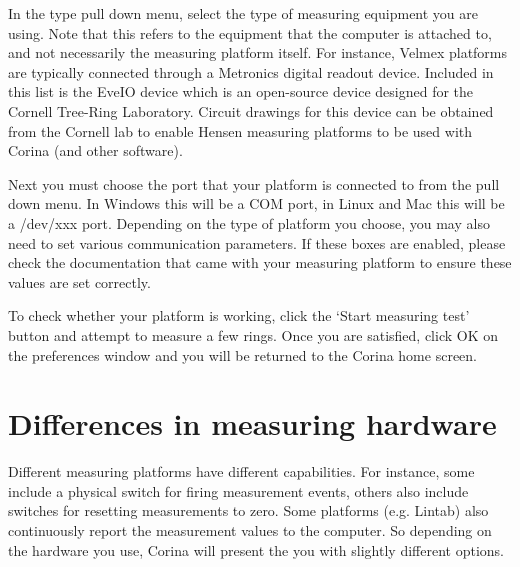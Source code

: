 In the type pull down menu, select the type of measuring equipment you are using. Note that this refers to the equipment that the computer is attached to, and not necessarily the measuring platform itself. For instance, Velmex platforms are typically connected through a Metronics digital readout device. Included in this list is the EveIO device which is an open-source device designed for the Cornell Tree-Ring Laboratory. Circuit drawings for this device can be obtained from the Cornell lab to enable Hensen measuring platforms to be used with Corina (and other software).


Next you must choose the port that your platform is connected to from the pull down menu. In Windows this will be a COM port, in Linux and Mac this will be a /dev/xxx port.  Depending on the type of platform you choose, you may also need to set various communication parameters.  If these boxes are enabled, please check the documentation that came with your measuring platform to ensure these values are set correctly.

To check whether your platform is working, click the `Start measuring test' button and attempt to measure a few rings.  Once you are satisfied, click OK on the preferences window and you will be returned to the Corina home screen.

\section{Differences in measuring hardware}

Different measuring platforms have different capabilities.  For instance, some include a physical switch for firing measurement events, others also include switches for resetting measurements to zero.  Some platforms (e.g. Lintab) also continuously report the measurement values to the computer.  So depending on the hardware you use, Corina will present the you with slightly different options.  


